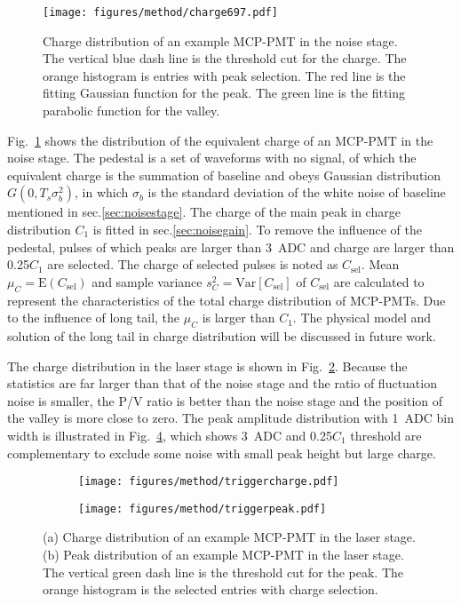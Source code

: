 \begin{figure}[!htbp]
    \centering
    \texttt{[image: figures/method/charge697.pdf]}
    \caption{Charge distribution of an example MCP-PMT in the noise stage. The vertical blue dash line is the threshold cut for the charge. The orange histogram is entries with peak selection. The red line is the fitting Gaussian function for the peak. The green line is the fitting parabolic function for the valley.}
    \label{fig:charge}
\end{figure}

Fig.~\ref{fig:charge} shows the distribution of the equivalent charge of an MCP-PMT in the noise stage. The pedestal is a set of waveforms with no signal, of which the equivalent charge is the summation of baseline and obeys Gaussian distribution $G(0, T_s\sigma_b^2)$, in which $\sigma_b$ is the standard deviation of the white noise of baseline mentioned in sec.\ref{sec:noisestage}. The charge of the main peak in charge distribution $C_1$ is fitted in sec.\ref{sec:noisegain}. To remove the influence of the pedestal, pulses of which peaks are larger than \SI{3}{ADC} and charge are larger than 0.25$C_1$ are selected. The charge of selected pulses is noted as $C_{\mathrm{sel}}$. Mean $\mu_{C}=\mathrm{E}(C_{\mathrm{sel}})$ and sample variance $s^2_{C}=\mathrm{Var}[C_{\mathrm{sel}}]$ of $C_{\mathrm{sel}}$ are calculated to represent the characteristics of the total charge distribution of MCP-PMTs. Due to the influence of long tail, the $\mu_{C}$ is larger than $C_1$. The physical model and solution of the long tail in charge distribution will be discussed in future work.

The charge distribution in the laser stage is shown in Fig.~\ref{fig:triggercharge}. Because the statistics are far larger than that of the noise stage and the ratio of fluctuation noise is smaller, the P/V ratio is better than the noise stage and the position of the valley is more close to zero. The peak amplitude distribution with \SI{1}{ADC} bin width is illustrated in Fig.~\ref{fig:triggerpeak}, which shows \SI{3}{ADC} and 0.25$C_1$ threshold are complementary to exclude some noise with small peak height but large charge.

\begin{figure}[!htbp]
    \centering
    \begin{subfigure}[b]{\SF\textwidth}
        \texttt{[image: figures/method/triggercharge.pdf]}
        \caption{}%
        \label{fig:triggercharge}
    \end{subfigure}
    \begin{subfigure}[b]{\SF\textwidth}
        \texttt{[image: figures/method/triggerpeak.pdf]}
        \caption{}%
        \label{fig:triggerpeak}
    \end{subfigure}
    \caption{(a) Charge distribution of an example MCP-PMT in the laser stage. (b) Peak distribution of an example MCP-PMT in the laser stage. The vertical green dash line is the threshold cut for the peak. The orange histogram is the selected entries with charge selection.}
\end{figure}

